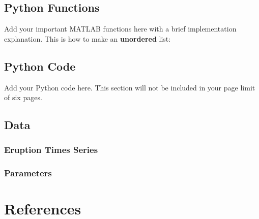 \documentclass{article}
\begin{document}
\begin{appendices}
\subsection{Python Functions}
Add your important MATLAB functions here with a brief implementation explanation. This is how to make an \textbf{unordered} list:

\subsection{Python Code}
Add your Python code here. This section will not be included in your page limit of six pages.

\subsection{Data}
\subsubsection{Eruption Times Series}
\subsubsection{Parameters}

\newpage
\section{References}
\printbibliography

\end{appendices}
\end{document}

